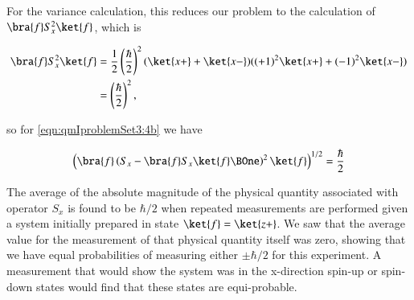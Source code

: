 For the variance calculation, this reduces our problem to the calculation of $\bra{f} S_x^2 \ket{f}$, which is

\begin{align*}
\bra{f} S_x^2 \ket{f} 
&=
\inv{2} \left( \frac{\hbar}{2} \right)^2 
( \ket{x+} + \ket{x-} ) ( (+1)^2 \ket{x+} + (-1)^2 \ket{x-} ) \\
&=
\left( \frac{\hbar}{2} \right)^2,
\end{align*}

so for \ref{eqn:qmIproblemSet3:4b} we have

\begin{align}\label{eqn:qmIproblemSet3:4b}
\left(\bra{f} \left( S_x - \bra{f} S_x \ket{f} \BOne \right)^2 \ket{f} \right)^{1/2} = \frac{\hbar}{2}
\end{align}

The average of the absolute magnitude of the physical quantity associated with operator $S_x$ is found to be $\hbar/2$ when repeated measurements are performed given a system initially prepared in state $\ket{f} = \ket{z+}$.  We saw that the average value for the measurement of that physical quantity itself was zero, showing that we have equal probabilities of measuring either $\pm \hbar/2$ for this experiment.  A measurement that would show the system was in the x-direction spin-up or spin-down states would find that these states are equi-probable.

\EndNoBibArticle
